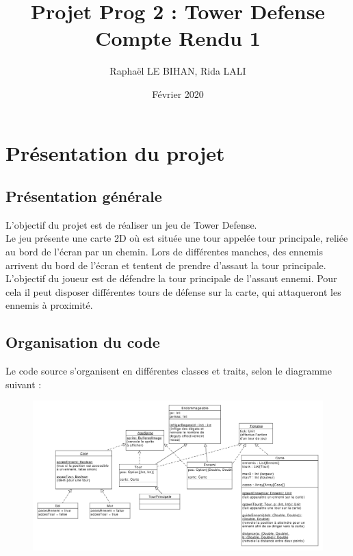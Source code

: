 \documentclass{article}
\title{
  Projet Prog 2 : Tower Defense\\
  \large Compte Rendu 1
}
\author{Raphaël LE BIHAN, Rida LALI}
\date{Février 2020}
\begin{document}
\maketitle

\section{Présentation du projet}

\subsection{Présentation générale}

L'objectif du projet est de réaliser un jeu de Tower Defense.\\
Le jeu présente une carte 2D où est située une tour appelée tour principale, reliée au bord de l'écran par un chemin. Lors de différentes manches, des ennemis arrivent du bord de l'écran et tentent de prendre d'assaut la tour principale.\\
L'objectif du joueur est de défendre la tour principale de l'assaut ennemi. Pour cela il peut disposer différentes tours de défense sur la carte, qui attaqueront les ennemis à proximité.

\subsection{Organisation du code}

Le code source s'organisent en différentes classes et traits, selon le diagramme suivant :\\

\begin{figure}[H]
  \includegraphics[width=\linewidth]{../diagramme.png}
  \label{Diagramme des classes}
\end{figure}
\end{document}
